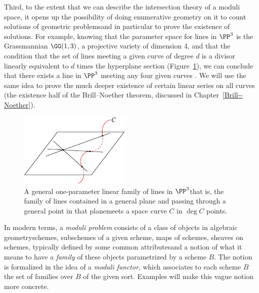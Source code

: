 Third, to the extent that we can describe the intersection theory of a
moduli space, it opens up the possibility of doing
enumerative geometry
%
on it to count solutions of geometric problems\emdash and in particular
to prove the existence of solutions. For example, knowing that the
%
parameter space for lines in $\PP^3$ is the Grassmannian $\GG(1,3)$,
%
a projective variety of dimension 4, and that the condition that the
set of lines meeting a given curve of degree $d$
is a divisor linearly equivalent to  $d$ times the hyperplane section
(Figure~\ref{Chow degree}), we can conclude  that there exists a line
in $\PP^3$ meeting any four given curves \cite[Section 3.4.1]{3264}. We
will use the same idea to prove the much deeper existence of certain
linear series on all curves (the existence half of the Brill--Noether
theorem, discussed in Chapter~\ref{Brill--Noether}).

\begin{figure}
\centerline {\includegraphics[height=1.4in]{"main/Fig06-2"}}
 \caption{A general  one-parameter linear family of lines in $\PP^3$\emdash that is, the family of lines
 contained in a general plane and passing through a general point in that plane\emdash meets a space curve $C$ in
 $\deg C$ points.}
 \label{Chow degree}
\end{figure}

In modern terms, a \emph{moduli problem}
%
consists of a class of objects
in algebraic geometry\emdash schemes, subschemes of a given scheme,
maps of schemes,
sheaves on schemes, typically defined by some common
attributes\emdash and a notion of what it means to have a \emph{family}
%
of these objects parametrized by a scheme $B$. The notion is formalized
in the idea of a \emph{moduli functor},
%
which associates to each scheme $B$ the set of families over $B$ of the
given sort. Examples will make this vague notion more concrete.



